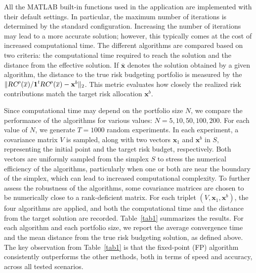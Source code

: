 \documentclass[preprint,11pt,authoryear]{elsarticle}
\begin{document}
All the MATLAB built-in functions used in the application are implemented with their default settings. In particular, the maximum number of iterations is determined by the standard configuration. Increasing the number of iterations may lead to a more accurate solution; however, this typically comes at the cost of increased computational time. The different algorithms are compared based on two criteria: the computational time required to reach the solution and the distance from the effective solution. If $\overline{\mathbf{x}}$ denotes the solution obtained by a given algorithm, the distance to the true risk budgeting portfolio is measured by the 
$\|\textsl{RC}^{\rho}(\overline{x})/\boldsymbol{1}^t \textsl{RC}^{\rho}(\overline{x}) - \mathbf{x}^b \|_2$. This metric evaluates how closely the realized risk contributions match the target risk allocation $\mathbf{x}^b$.

Since computational time may depend on the portfolio size $N$, we compare the performance of the algorithms for various values: $N = 5, 10, 50, 100, 200$. For each value of $N$, we generate $T = 1000$ random experiments. In each experiment, a covariance matrix $V$ is sampled, along with two vectors $\mathbf{x}_1$ and $\mathbf{x}^b$ in $S$, representing the initial point and the target risk budget, respectively. Both vectors are uniformly sampled from the simplex $S$ to stress the numerical efficiency of the algorithms, particularly when one or both are near the boundary of the simplex, which can lead to increased computational complexity. To further assess the robustness of the algorithms, some covariance matrices are chosen to be numerically close to a rank-deficient matrix. For each triplet $(V, \mathbf{x}_1, \mathbf{x}^b)$, the four algorithms are applied, and both the computational time and the distance from the target solution are recorded. Table~\ref{tab1} summarizes the results. For each algorithm and each portfolio size, we report the average convergence time and the mean distance from the true risk budgeting solution, as defined above. The key observation from Table~\ref{tab1} is that the fixed-point (FP) algorithm consistently outperforms the other methods, both in terms of speed and accuracy, across all tested scenarios.
\end{document}
